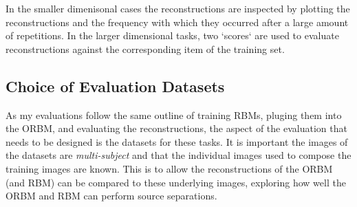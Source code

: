 In the smaller dimenisonal cases the reconstructions are inspected by plotting the reconstructions and the frequency with which they occurred after a large amount of repetitions. In the larger dimensional tasks, two `scores` are used to evaluate reconstructions against the corresponding item of the training set.



\subsection{Choice of Evaluation Datasets}

As my evaluations follow the same outline of training RBMs, pluging them into the ORBM, and evaluating the reconstructions, the aspect of the evaluation that needs to be designed is the datasets for these tasks. It is important the images of the datasets are \emph{multi-subject} and that the individual images used to compose the training images are known. This is to allow the reconstructions of the ORBM (and RBM) can be compared to these underlying images, exploring how well the ORBM and RBM can perform source separations.

